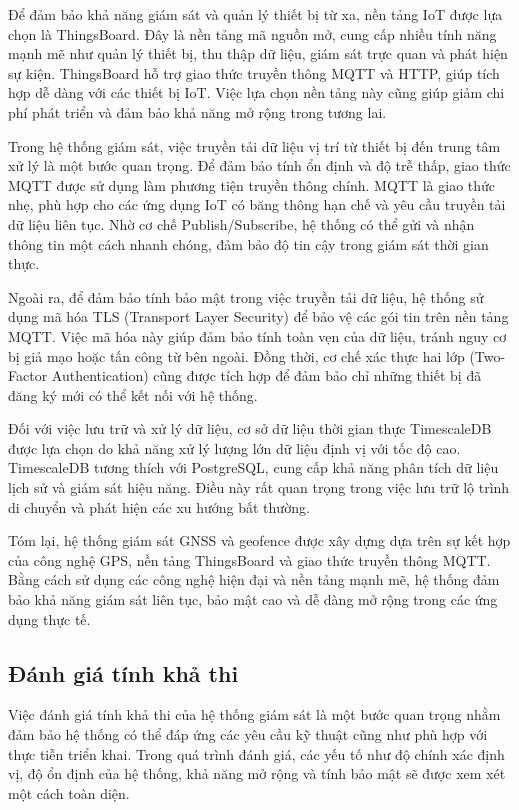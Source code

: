 \documentclass[../DoAn.tex]{subfiles}
\begin{document}
Để đảm bảo khả năng giám sát và quản lý thiết bị từ xa, nền tảng IoT được lựa chọn là ThingsBoard. Đây là nền tảng mã nguồn mở, cung cấp nhiều tính năng mạnh mẽ như quản lý thiết bị, thu thập dữ liệu, giám sát trực quan và phát hiện sự kiện. ThingsBoard hỗ trợ giao thức truyền thông MQTT và HTTP, giúp tích hợp dễ dàng với các thiết bị IoT. Việc lựa chọn nền tảng này cũng giúp giảm chi phí phát triển và đảm bảo khả năng mở rộng trong tương lai.

Trong hệ thống giám sát, việc truyền tải dữ liệu vị trí từ thiết bị đến trung tâm xử lý là một bước quan trọng. Để đảm bảo tính ổn định và độ trễ thấp, giao thức MQTT được sử dụng làm phương tiện truyền thông chính. MQTT là giao thức nhẹ, phù hợp cho các ứng dụng IoT có băng thông hạn chế và yêu cầu truyền tải dữ liệu liên tục. Nhờ cơ chế Publish/Subscribe, hệ thống có thể gửi và nhận thông tin một cách nhanh chóng, đảm bảo độ tin cậy trong giám sát thời gian thực.

Ngoài ra, để đảm bảo tính bảo mật trong việc truyền tải dữ liệu, hệ thống sử dụng mã hóa TLS (Transport Layer Security) để bảo vệ các gói tin trên nền tảng MQTT. Việc mã hóa này giúp đảm bảo tính toàn vẹn của dữ liệu, tránh nguy cơ bị giả mạo hoặc tấn công từ bên ngoài. Đồng thời, cơ chế xác thực hai lớp (Two-Factor Authentication) cũng được tích hợp để đảm bảo chỉ những thiết bị đã đăng ký mới có thể kết nối với hệ thống.

Đối với việc lưu trữ và xử lý dữ liệu, cơ sở dữ liệu thời gian thực TimescaleDB được lựa chọn do khả năng xử lý lượng lớn dữ liệu định vị với tốc độ cao. TimescaleDB tương thích với PostgreSQL, cung cấp khả năng phân tích dữ liệu lịch sử và giám sát hiệu năng. Điều này rất quan trọng trong việc lưu trữ lộ trình di chuyển và phát hiện các xu hướng bất thường.

Tóm lại, hệ thống giám sát GNSS và geofence được xây dựng dựa trên sự kết hợp của công nghệ GPS, nền tảng ThingsBoard và giao thức truyền thông MQTT. Bằng cách sử dụng các công nghệ hiện đại và nền tảng mạnh mẽ, hệ thống đảm bảo khả năng giám sát liên tục, bảo mật cao và dễ dàng mở rộng trong các ứng dụng thực tế.
\subsection{Đánh giá tính khả thi}
\label{subsection:2.2.3}
Việc đánh giá tính khả thi của hệ thống giám sát là một bước quan trọng nhằm đảm bảo hệ thống có thể đáp ứng các yêu cầu kỹ thuật cũng như phù hợp với thực tiễn triển khai. Trong quá trình đánh giá, các yếu tố như độ chính xác định vị, độ ổn định của hệ thống, khả năng mở rộng và tính bảo mật sẽ được xem xét một cách toàn diện.
\end{document}
